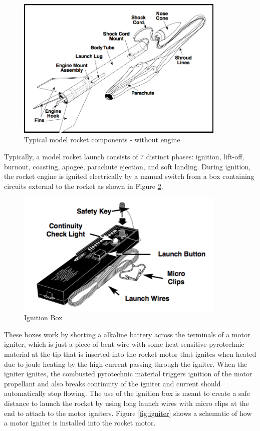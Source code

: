 \documentclass{workreport}
\begin{document}
\begin{body}
	\begin{figure}[!ht]
		\centering
		\includegraphics[width=10cm]{./images/model_rocket_components.png}
		\caption{Typical model rocket components - without engine \cite{estes_rocket_tech}}
		\label{fig:rocket_comp}
	\end{figure}


	Typically, a model rocket launch consists of 7 distinct phases: ignition, lift-off, burnout, coasting, apogee, parachute ejection, and soft landing. During ignition, the rocket engine is ignited electrically by a manual switch from a box containing circuits external to the rocket as shown in Figure \ref{fig:ignition_box}.

	\begin{figure}[!ht]
		\centering
		\includegraphics[width=10cm]{./images/ignition_box.png}
		\caption{Ignition Box \cite{estes_rocket_tech}}
		\label{fig:ignition_box}
	\end{figure}

	These boxes work by shorting a alkaline battery across the terminals of a motor igniter, which is just a piece of bent wire with some heat sensitive pyrotechnic material at the tip that is inserted into the rocket motor that ignites when heated due to joule heating by the high current passing through the igniter. When the igniter ignites, the combusted pyrotechnic material triggers ignition of the motor propellant and also breaks continuity of the igniter and current should automatically stop flowing. The use of the ignition box is meant to create a safe distance to launch the rocket by using long launch wires with micro clips at the end to attach to the motor igniters. Figure \ref{fig:igniter} shows a schematic of how a motor igniter is installed into the rocket motor.


\end{body}
\end{document}
